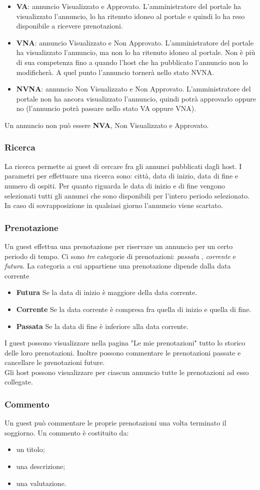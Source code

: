 \documentclass[1_relazione.tex]{subfiles}
\begin{document}
\begin{itemize}
\item \textbf{VA}: annuncio Visualizzato e Approvato. L'amministratore del portale ha visualizzato l'annuncio, lo ha ritenuto idoneo al portale e quindi lo ha reso disponibile a ricevere prenotazioni.
\item \textbf{VNA}: annuncio Visualizzato e Non Approvato. L'amministratore del portale ha visualizzato l'annuncio, ma non lo ha ritenuto idoneo al portale. Non è più di sua competenza fino a quando l'host che ha pubblicato l'annuncio non lo modificherà. A quel punto l'annuncio tornerà nello stato NVNA.
\item \textbf{NVNA}: annuncio Non Visualizzato e Non Approvato. L'amministratore del portale non ha ancora visualizzato l'annuncio, quindi potrà approvarlo oppure no (l'annuncio potrà passare nello stato VA oppure VNA).
\end{itemize}
Un annuncio non pu\`{o} essere \textbf{NVA},  Non Visualizzato e Approvato.

\subsubsection{Ricerca} 
La ricerca permette ai guest di cercare fra gli annunci pubblicati dagli host. I parametri per effettuare una ricerca sono: città, data di inizio, data di fine e numero di ospiti. Per quanto riguarda le data di inizio e di fine vengono selezionati tutti gli annunci che sono disponibili per l'intero periodo selezionato. In caso di sovrapposizione in qualsiasi giorno l'annuncio viene scartato.

\subsubsection{Prenotazione} 
Un guest effettua una prenotazione per riservare un annuncio per un certo periodo di tempo. Ci sono \textit{tre} categorie di prenotazioni: \textit{passata} , \textit{corrente} e \textit{futura}.  La categoria a cui appartiene una prenotazione dipende dalla data corrente \\
\begin{itemize}
\item \textbf{Futura} Se la data di inizio \`{e} maggiore della data corrente.
\item \textbf{Corrente} Se la data corrente \`{e} compresa fra quella di inizio e quella di fine.
\item \textbf{Passata} Se la data di fine \`{e} inferiore alla data corrente.
\end{itemize}
I guest possono visualizzare nella pagina "Le mie prenotazioni" tutto lo storico delle loro prenotazioni. Inoltre possono commentare le prenotazioni passate e cancellare le prenotazioni future.\\
Gli host possono visualizzare per ciascun annuncio tutte le prenotazioni ad esso collegate.

\subsubsection{Commento} 
Un guest pu\`{o} commentare le proprie prenotazioni una volta terminato il soggiorno. Un commento \`{e} costituito da:
\begin{itemize}
 \item un titolo;
 \item una descrizione;
 \item una valutazione.
\end{itemize}
\end{document}

